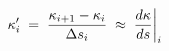 \documentclass[preview]{standalone}
\begin{document}
\begin{align*}
\special{dvisvgm:raw <g id='unique000'>}\kappa'_i \;=\; \dfrac{\kappa_{i+1} - \kappa_i}{\Delta s_i} \;\approx\; \dfrac{d\kappa}{ds}\bigg|_i\special{dvisvgm:raw </g>}
\end{align*}
\end{document}
